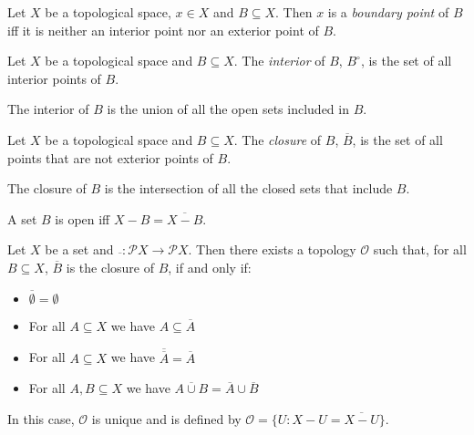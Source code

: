 \begin{df}
Let $X$ be a topological space, $x \in X$ and $B \subseteq X$. Then $x$ is a \emph{boundary point} of $B$ iff it is neither an interior point nor an exterior point of $B$.
\end{df}

\begin{df}[Interior]
Let $X$ be a topological space and $B \subseteq X$. The \emph{interior} of $B$, $B^\circ$, is the set of all interior points of $B$.
\end{df}

\begin{prop}
The interior of $B$ is the union of all the open sets included in $B$.
\end{prop}

\begin{df}[Closure]
Let $X$ be a topological space and $B \subseteq X$. The \emph{closure} of $B$, $\overline{B}$, is the set of all points that are not exterior points of $B$.
\end{df}

\begin{prop}
The closure of $B$ is the intersection of all the closed sets that include $B$.
\end{prop}

\begin{prop}
A set $B$ is open iff $X - B = \overline{X - B}$.
\end{prop}

\begin{prop}
Let $X$ be a set and $\overline{\ } : \mathcal{P} X \rightarrow \mathcal{P} X$. Then there exists a topology $\mathcal{O}$ such that, for all $B \subseteq X$, $\overline{B}$ is the closure of $B$, if and only if:
\begin{itemize}
\item $\overline{\emptyset} = \emptyset$
\item For all $A \subseteq X$ we have $A \subseteq \overline{A}$
\item For all $A \subseteq X$ we have $\overline{\overline{A}} = \overline{A}$
\item For all $A, B \subseteq X$ we have $\overline{A \cup B} = \overline{A} \cup \overline{B}$
\end{itemize}
In this case, $\mathcal{O}$ is unique and is defined by $\mathcal{O} = \{ U : X - U = \overline{X - U} \}$.
\end{prop}

